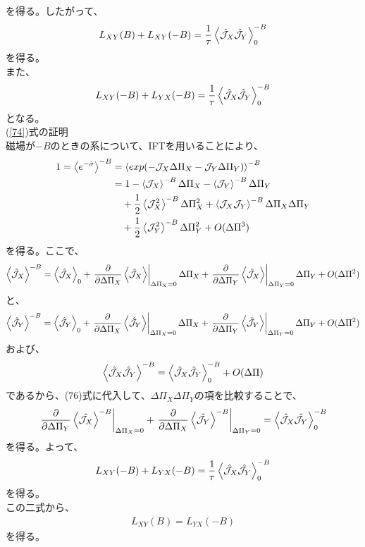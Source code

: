 \documentclass[a4paper,11pt]{jsarticle}
\begin{document}
を得る。したがって、
\begin{align}
    L_{XY} (B) + L_{XY} (-B) = \frac{1}{\tau} \ev{\hat{\mathcal{J}}_X \hat{\mathcal{J}}_Y}_0^{-B}
\end{align}
を得る。\\
また、
\begin{align}
    \label{74}
    L_{XY} (-B) + L_{YX} (-B) = \frac{1}{\tau} \ev{\hat{\mathcal{J}}_X \hat{\mathcal{J}}_Y}_0^{-B}
\end{align}
となる。\\
(\ref{74})式の証明\\
磁場が$-B$のときの系について、IFTを用いることにより、
\begin{align}
    1=\ev{e^{-\hat{\sigma}}}^{-B} &= \ev{exp(-\mathcal{J}_X \Delta \Pi_X - \mathcal{J}_Y \Delta \Pi_Y)}^{-B}\\
    &= 1-\ev{\mathcal{J}_X}^{-B} \Delta \Pi_X - \ev{\mathcal{J}_Y}^{-B} \Delta \Pi_Y \\
    &\quad+ \frac{1}{2}\ev{\mathcal{J}_X^2}^{-B} \Delta \Pi_X^2 + \ev{\mathcal{J}_X \mathcal{J}_Y}^{-B} \Delta \Pi_X \Delta \Pi_Y \\
    &\quad+ \frac{1}{2}\ev{\mathcal{J}_Y^2}^{-B} \Delta \Pi_Y^2 + O(\Delta \Pi^3)
\end{align}
を得る。ここで、
\begin{align}
    \ev{\hat{\mathcal{J}}_X}^{-B} = \ev{\hat{\mathcal{J}}_X}_0 + \left.\pdv{\Delta \Pi_X} \ev{\hat{\mathcal{J}}_X}\right|_{\Delta \Pi_X = 0} \Delta \Pi_X +\left.\pdv{\Delta \Pi_Y} \ev{\hat{\mathcal{J}}_X}\right|_{\Delta \Pi_Y = 0} \Delta \Pi_Y + O(\Delta \Pi^2)
\end{align}
と、
\begin{align}
    \ev{\hat{\mathcal{J}}_Y}^{-B} = \ev{\hat{\mathcal{J}}_Y}_0 + \left.\pdv{\Delta \Pi_X} \ev{\hat{\mathcal{J}}_Y}\right|_{\Delta \Pi_X = 0} \Delta \Pi_X +\left.\pdv{\Delta \Pi_Y} \ev{\hat{\mathcal{J}}_Y}\right|_{\Delta \Pi_Y = 0} \Delta \Pi_Y + O(\Delta \Pi^2)
\end{align}
および、
\begin{align}
    \ev{\hat{\mathcal{J}}_X \hat{\mathcal{J}}_Y}^{-B} = \ev{\hat{\mathcal{J}}_X \hat{\mathcal{J}}_Y}^{-B}_0 +O(\Delta \Pi)
\end{align}
であるから、(76)式に代入して、$\Delta \Pi_X \Delta \Pi_Y$の項を比較することで、
\begin{align}
    \left.\pdv{\Delta \Pi_Y} \ev{\hat{\mathcal{J}_X}}^{-B}\right|_{\Delta \Pi_X = 0} + \left.\pdv{\Delta \Pi_X} \ev{\hat{\mathcal{J}_Y}}^{-B}\right|_{\Delta \Pi_Y = 0} = \ev{\hat{\mathcal{J}}_X \hat{\mathcal{J}_Y}}^{-B}_0
\end{align}
を得る。よって、
\begin{align}
    L_{XY} (-B) + L_{YX} (-B) = \frac{1}{\tau}\ev{\hat{\mathcal{J}}_X \hat{\mathcal{J}_Y}}^{-B}_0
\end{align}
を得る。\\


この二式から、
\begin{align}
    L_{XY} (B) = L_{YX} (-B)
\end{align}
を得る。\hfill \qedsymbol
\end{document}
